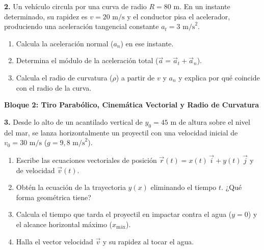 \documentclass[11pt,a4paper]{article}
\begin{document}
\vspace{0.5cm}
\noindent\textbf{2.} Un vehículo circula por una curva de radio $R = 80\text{ m}$. En un instante determinado, su rapidez es $v = 20\text{ m/s}$ y el conductor pisa el acelerador, produciendo una aceleración tangencial constante $a_t = 3\text{ m/s}^2$.
\begin{enumerate}[label=\textbf{\alph*)}, leftmargin=2em, itemsep=6pt]
    \item Calcula la aceleración normal ($a_n$) en ese instante.
    \item Determina el módulo de la aceleración total ($\vec{a} = \vec{a}_t + \vec{a}_n$).
    \item Calcula el radio de curvatura ($\rho$) a partir de $v$ y $a_n$ y explica por qué coincide con el radio de la curva.
\end{enumerate}

\newpage

\noindent\textbf{Bloque 2: Tiro Parabólico, Cinemática Vectorial y Radio de Curvatura}

\vspace{0.4cm}
\noindent\textbf{3.} Desde lo alto de un acantilado vertical de $y_0 = 45\text{ m}$ de altura sobre el nivel del mar, se lanza horizontalmente un proyectil con una velocidad inicial de $v_0 = 30\text{ m/s}$ ($g = 9{,}8\text{ m/s}^2$).
\begin{enumerate}[label=\textbf{\alph*)}, leftmargin=2em, itemsep=6pt]
    \item Escribe las ecuaciones vectoriales de posición $\vec{r}(t) = x(t)\,\vec{i} + y(t)\,\vec{j}$ y de velocidad $\vec{v}(t)$.
    \item Obtén la ecuación de la trayectoria $y(x)$ eliminando el tiempo $t$. ¿Qué forma geométrica tiene?
    \item Calcula el tiempo que tarda el proyectil en impactar contra el agua ($y = 0$) y el alcance horizontal máximo ($x_{\text{máx}}$).
    \item Halla el vector velocidad $\vec{v}$ y su rapidez al tocar el agua.
\end{enumerate}
\end{document}
